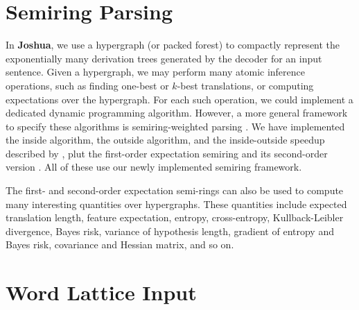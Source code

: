 \documentclass[11pt]{article}
\newcommand{\joshua}{\textbf{Joshua}\xspace}
\begin{document}
\section{Semiring Parsing}

In \joshua, we use a hypergraph (or packed forest) to compactly 
represent the exponentially many derivation trees generated by the decoder for an input sentence.
Given a hypergraph, we may perform many atomic inference operations,
such as finding one-best or $k$-best translations, or computing expectations over the hypergraph.
For each such operation, we could implement a dedicated dynamic programming algorithm.
However, a more general framework to specify these algorithms is semiring-weighted parsing \cite{semiringparsing}.
We have implemented  the inside algorithm, the outside algorithm, and the inside-outside speedup described by ,
plut the first-order expectation semiring \cite{eisner-expectation-semiring} and its
second-order version \cite{li-eisner:2009:EMNLP}.  All of these use our newly implemented semiring framework.


The first- and second-order expectation semi-rings can also be used to compute many interesting quantities over hypergraphs.
These quantities include expected translation length, feature expectation, entropy, cross-entropy, Kullback-Leibler divergence,
Bayes risk, variance of hypothesis length, gradient of entropy and Bayes risk, covariance and Hessian matrix, and so on.



\section{Word Lattice Input}
\end{document}
